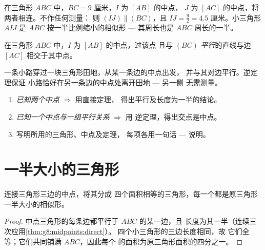 \begin{example}\label{ex:g8:midpoints:direct}
在三角形 $ABC$ 中，$BC = 9$ 厘米，$I$ 为 $[AB]$ 的中点，
$J$ 为 $[AC]$ 的中点，将两者相连。不作任何测量：
则 $(IJ) \parallel (BC)$，且 $IJ = \frac92 = 4.5$ 厘米。小三角形
$AIJ$ 是 $ABC$ 按一半比例缩小的相似形 --- 其周长也是
$ABC$ 周长的一半。
\end{example}

\begin{theorem}[逆定理]\label{thm:g8:midpoints:converse}
在三角形 $ABC$ 中，$I$ 为 $[AB]$ 的中点，过该点
且与 $(BC)$ \emph{平行}的直线与边 $[AC]$ 相交于其中点。
\end{theorem}
\admitted

\begin{example}\label{ex:g8:midpoints:converse}
一条小路穿过一块三角形田地，从某一条边的中点出发，
并与其对边平行。逆定理保证
小路恰好在另一条边的中点处离开田地 --- 另一侧
无需测量。
\end{example}

\begin{method}[在定理与逆定理之间选择]\label{met:g8:midpoints:choose}
\begin{enumerate}
  \item \emph{已知两个中点} $\Rightarrow$ 用直接定理，
        得出平行及长度为一半的结论。
  \item \emph{已知一个中点与一组平行关系} $\Rightarrow$ 用
        逆定理，得出交点是中点。
  \item 写明所用的三角形、中点及定理，
        每项各用一句话 --- 说明。
\end{enumerate}
\end{method}

\section{一半大小的三角形}

\begin{proposition}[中点三角形]\label{prop:g8:midpoints:medial}
连接三角形三边的中点，将其分成
四个面积相等的三角形，每一个都是原三角形一半大小的相似形。
\end{proposition}

\begin{proof}
中点三角形的每条边都平行于 $ABC$ 的某一边，且
长度为其一半（连续三次应用\cref{thm:g8:midpoints:direct}）。
四个小三角形的三边长度相同，故
它们全等；它们共同铺满 $ABC$，因此每个
的面积为原三角形面积的四分之一。
\end{proof}


